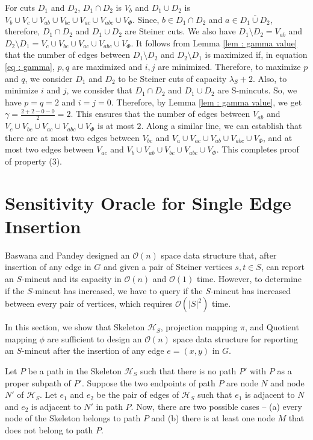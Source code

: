\documentclass[letterpaper,11pt]{article}
\begin{document}
For cuts $D_1$ and $D_2$, $D_1\cap D_2$ is $V_b$ and $D_1\cup D_2$ is $V_b \cup V_c \cup V_{ab} \cup V_{bc} \cup V_{ac}\cup V_{abc} \cup V_{\Phi}$. Since, $b\in D_1\cap D_2$ and $a\in \overline{D_1\cup D_2}$, therefore, $D_1\cap D_2$ and $D_1\cup D_2$ are Steiner cuts. We also have $D_1\setminus D_2=V_{ab}$ and $D_2\setminus D_1=V_c\cup V_{bc}\cup V_{ac}\cup V_{abc} \cup V_{\Phi}$. It follows from Lemma \ref{lem : gamma value} that the number of edges between $D_1\setminus D_2$ and $D_2\setminus D_1$ is maximized if, in equation \ref{eq : gamma}, $p,q$ are maximized and $i,j$ are minimized. Therefore, to maximize $p$ and $q$, we consider $D_1$ and $D_2$ to be Steiner cuts of capacity $\lambda_S+2$. Also, to minimize $i$ and $j$, we consider that $D_1\cap D_2$ and $D_1\cup D_2$ are S-mincuts. So, we have $p=q=2$ and $i=j=0$. Therefore, by Lemma \ref{lem : gamma value}, we get $\gamma= \frac{2+2-0-0}{2}=2$. This ensures that the number of edges between $V_{ab}$ and $V_c\cup V_{bc}\cup V_{ac}\cup V_{abc} \cup V_{\Phi}$ is at most $2$. Along a similar line, we can establish that there are at most two edges between $V_{bc}$ and $V_a\cup V_{ac}\cup V_{ab}\cup V_{abc} \cup V_{\Phi}$, and at most two edges between $V_{ac}$ and $V_b\cup V_{ab}\cup V_{bc}\cup V_{abc} \cup V_{\Phi}$. This completes proof of property (3). 

\section{Sensitivity Oracle for Single Edge Insertion} \label{app : single edge insertion}
 Baswana and Pandey \cite{DBLP:conf/soda/BaswanaP22} designed an ${\mathcal O}(n)$ space data structure that, after insertion of any edge in $G$ and given a pair of Steiner vertices $s,t\in S$, can report an $S$-mincut and its capacity in ${\mathcal O}(n)$ and ${\mathcal O}(1)$ time. However, to determine if the $S$-mincut has increased, we have to query if the $S$-mincut has increased between every pair of vertices, which requires ${\mathcal O}(|S|^2)$ time.

In this section, we show that Skeleton ${\mathcal H}_S$, projection mapping $\pi$, and Quotient mapping $\phi$ are sufficient to design an ${\mathcal O}(n)$ space data structure for reporting an $S$-mincut after the insertion of any edge $e=(x,y)$ in $G$. 

Let $P$ be a path in the Skeleton ${\mathcal H}_S$ such that there is no path $P'$ with $P$ as a proper subpath of $P'$. Suppose the two endpoints of path $P$ are node $N$ and node $N'$ of ${\mathcal H}_S$. Let $e_1$ and $e_2$ be the pair of edges of ${\mathcal H}_S$ such that $e_1$ is adjacent to $N$ and $e_2$ is adjacent to $N'$ in path $P$. Now, there are two possible cases -- (a) every node of the Skeleton belongs to path $P$ and (b) there is at least one node $M$ that does not belong to path $P$. \\
\end{document}
